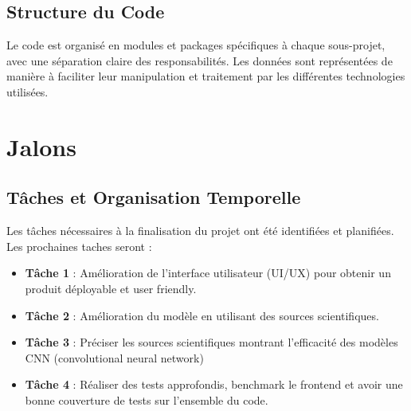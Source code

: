 \documentclass[12pt]{article}
\begin{document}
\subsection{Structure du Code}

Le code est organisé en modules et packages spécifiques à chaque sous-projet, avec une séparation claire des responsabilités. Les données sont représentées de manière à faciliter leur manipulation et traitement par les différentes technologies utilisées.

\section{Jalons}

\subsection{Tâches et Organisation Temporelle}

Les tâches nécessaires à la finalisation du projet ont été identifiées et planifiées. Les prochaines taches seront :

\begin{itemize}
  \setlength\itemsep{1em}
  \item \textbf{Tâche 1} : Amélioration de l'interface utilisateur (UI/UX) pour obtenir un produit déployable et user friendly.
  \item \textbf{Tâche 2 }: Amélioration du modèle en utilisant des sources scientifiques.
  \item \textbf{Tâche 3} : Préciser les sources scientifiques montrant l'efficacité des modèles CNN (convolutional neural network)
  \item \textbf{Tâche 4} : Réaliser des tests approfondis, benchmark le frontend et avoir une bonne couverture de tests sur l'ensemble du code.
\end{itemize}
\end{document}
